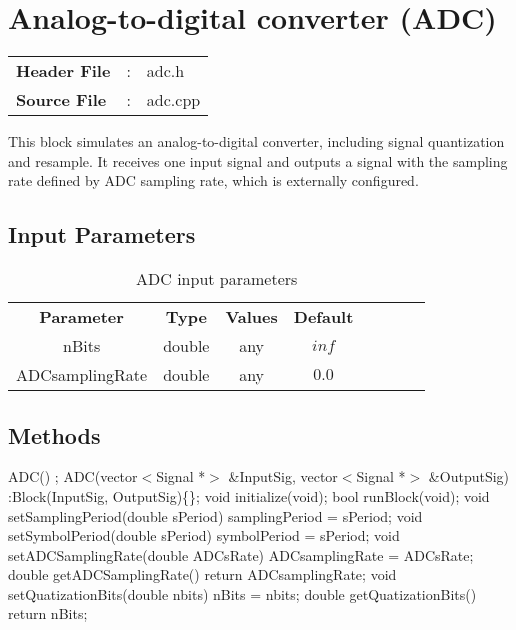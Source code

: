 \clearpage

\section{Analog-to-digital converter (ADC)}

\begin{tcolorbox}	
	\begin{tabular}{p{2.75cm} p{0.2cm} p{10.5cm}} 	
		\textbf{Header File}   &:& adc.h \\
		\textbf{Source File}   &:& adc.cpp \\
	\end{tabular}
\end{tcolorbox}

This block simulates an analog-to-digital converter, including signal quantization and resample. It receives one input signal and outputs a signal with the sampling rate defined by ADC sampling rate, which is externally configured.

\subsection*{Input Parameters}

\begin{table}[h]
	\centering
	\begin{tabular}{|c|c|c|c|cccc}
		\cline{1-4}
		\textbf{Parameter} & \textbf{Type} & \textbf{Values} &   \textbf{Default}& \\ \cline{1-4}
		nBits & double & any & $inf$ \\ \cline{1-4}
		ADCsamplingRate & double & any & $0.0$ \\ \cline{1-4}		
	\end{tabular}
	\caption{ADC input parameters}
	\label{table:ADC_in_par}
\end{table}


\subsection*{Methods}

ADC() {};
\bigbreak
ADC(vector$<$Signal *$>$ \&InputSig, vector$<$Signal *$>$ \&OutputSig) :Block(InputSig, OutputSig)\{\};
\bigbreak
void initialize(void);
\bigbreak
bool runBlock(void);
\bigbreak
void setSamplingPeriod(double sPeriod) { samplingPeriod = sPeriod; }
\bigbreak
void setSymbolPeriod(double sPeriod) { symbolPeriod = sPeriod; }
\bigbreak
void setADCSamplingRate(double ADCsRate) { ADCsamplingRate = ADCsRate; }
\bigbreak
double getADCSamplingRate() { return ADCsamplingRate; }
\bigbreak
void setQuatizationBits(double nbits) { nBits = nbits; }
\bigbreak
double getQuatizationBits() { return nBits; }

